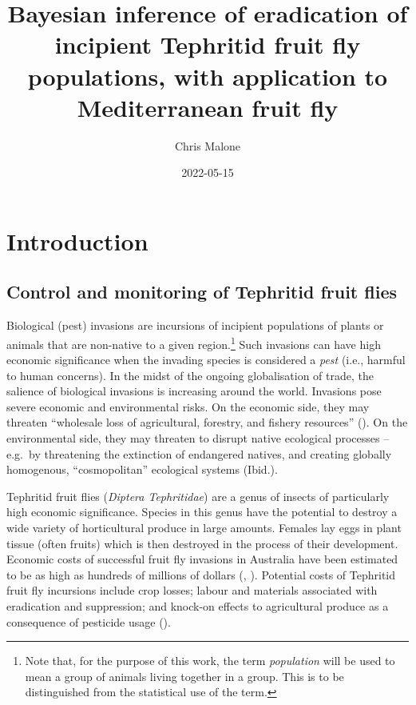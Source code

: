 \documentclass[
  oneside]{book}
\title{Bayesian inference of eradication of incipient Tephritid fruit fly populations, with application to Mediterranean fruit fly}
\author{Chris Malone}
\date{2022-05-15}
\begin{document}
\maketitle

\renewcommand{\baselinestretch}{1}\normalsize
\tableofcontents
\renewcommand{\baselinestretch}{2}\normalsize

\hypertarget{introduction}{%
\chapter{Introduction}\label{introduction}}

\hypertarget{control-and-monitoring-of-tephritid-fruit-flies}{%
\section{Control and monitoring of Tephritid fruit flies}\label{control-and-monitoring-of-tephritid-fruit-flies}}

Biological (pest) invasions are incursions of incipient populations of plants or animals that are non-native to a given region.\footnote{Note that, for the purpose of this work, the term \emph{population} will be used to mean a group of animals living together in a group. This is to be distinguished from the statistical use of the term.} Such invasions can have high economic significance when the invading species is considered a \emph{pest} (i.e., harmful to human concerns). In the midst of the ongoing globalisation of trade, the salience of biological invasions is increasing around the world. Invasions pose severe economic and environmental risks. On the economic side, they may threaten ``wholesale loss of agricultural, forestry, and fishery resources'' (\citet{mack2000}). On the environmental side, they may threaten to disrupt native ecological processes -- e.g.~by threatening the extinction of endangered natives, and creating globally homogenous, ``cosmopolitan'' ecological systems (Ibid.).

Tephritid fruit flies (\emph{Diptera Tephritidae}) are a genus of insects of particularly high economic significance. Species in this genus have the potential to destroy a wide variety of horticultural produce in large amounts. Females lay eggs in plant tissue (often fruits) which is then destroyed in the process of their development. Economic costs of successful fruit fly invasions in Australia have been estimated to be as high as hundreds of millions of dollars (\citet{suckling2016}, \citet{hancock2000}). Potential costs of Tephritid fruit fly incursions include crop losses; labour and materials associated with eradication and suppression; and knock-on effects to agricultural produce as a consequence of pesticide usage (\citet{suckling2016}).
\end{document}
